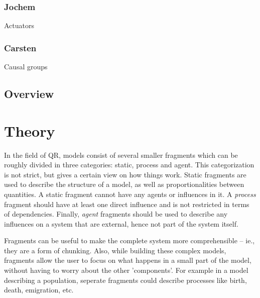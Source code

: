 \documentclass{article} %
\begin{document}

\subsubsection{Jochem}

Actuators



\subsubsection{Carsten}


Causal groups %

\subsection{Overview}



\newpage

\section{Theory}
\label{sec:theory}
In the field of QR, models %
consist of several smaller fragments which can be roughly divided in three
categories: static, process and agent. This categorization is not strict, but
gives a certain view on how things work. Static fragments are used to describe
the structure of a model, as well as proportionalities between quantities. A
static fragment cannot have any agents or influences in it. A \emph{process}
fragment should have at least one direct influence and is not restricted in
terms of dependencies. %
Finally, \emph{agent} fragments should be used to describe any influences on a
system that are external, hence not part of the system itself.

Fragments can be useful to make the complete system more comprehensible --
ie., they are a form of chunking.  Also, while building these complex models,
fragments allow the user to focus on what happens in a small part of the
model, without having to worry about the other 'components'. For example in a
model describing a population, seperate fragments could describe processes
like birth, death, emigration, etc.
\end{document}
